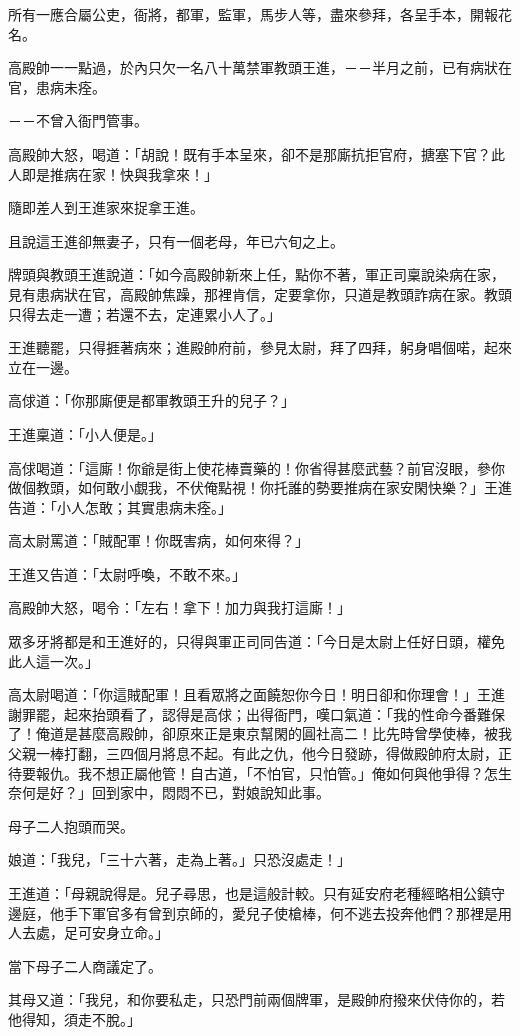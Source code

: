 \documentclass[11pt,a4paper]{article}
\begin{document}
所有一應合屬公吏，衙將，都軍，監軍，馬步人等，盡來參拜，各呈手本，開報花名。

高殿帥一一點過，於內只欠一名八十萬禁軍教頭王進，－－半月之前，已有病狀在官，患病未痊。

－－不曾入衙門管事。

高殿帥大怒，喝道：「胡說！既有手本呈來，卻不是那廝抗拒官府，搪塞下官？此人即是推病在家！快與我拿來！」

隨即差人到王進家來捉拿王進。

且說這王進卻無妻子，只有一個老母，年已六旬之上。

牌頭與教頭王進說道：「如今高殿帥新來上任，點你不著，軍正司稟說染病在家，見有患病狀在官，高殿帥焦躁，那裡肯信，定要拿你，只道是教頭詐病在家。教頭只得去走一遭；若還不去，定連累小人了。」

王進聽罷，只得捱著病來；進殿帥府前，參見太尉，拜了四拜，躬身唱個喏，起來立在一邊。

高俅道：「你那廝便是都軍教頭王升的兒子？」

王進稟道：「小人便是。」

高俅喝道：「這廝！你爺是街上使花棒賣藥的！你省得甚麼武藝？前官沒眼，參你做個教頭，如何敢小覷我，不伏俺點視！你托誰的勢要推病在家安閑快樂？」王進告道：「小人怎敢；其實患病未痊。」

高太尉罵道：「賊配軍！你既害病，如何來得？」

王進又告道：「太尉呼喚，不敢不來。」

高殿帥大怒，喝令：「左右！拿下！加力與我打這廝！」

眾多牙將都是和王進好的，只得與軍正司同告道：「今日是太尉上任好日頭，權免此人這一次。」

高太尉喝道：「你這賊配軍！且看眾將之面饒恕你今日！明日卻和你理會！」王進謝罪罷，起來抬頭看了，認得是高俅；出得衙門，嘆口氣道：「我的性命今番難保了！俺道是甚麼高殿帥，卻原來正是東京幫閑的圓社高二！比先時曾學使棒，被我父親一棒打翻，三四個月將息不起。有此之仇，他今日發跡，得做殿帥府太尉，正待要報仇。我不想正屬他管！自古道，「不怕官，只怕管。」俺如何與他爭得？怎生奈何是好？」回到家中，悶悶不已，對娘說知此事。

母子二人抱頭而哭。

娘道：「我兒，「三十六著，走為上著。」只恐沒處走！」

王進道：「母親說得是。兒子尋思，也是這般計較。只有延安府老種經略相公鎮守邊庭，他手下軍官多有曾到京師的，愛兒子使槍棒，何不逃去投奔他們？那裡是用人去處，足可安身立命。」

當下母子二人商議定了。

其母又道：「我兒，和你要私走，只恐門前兩個牌軍，是殿帥府撥來伏侍你的，若他得知，須走不脫。」
\end{document}
